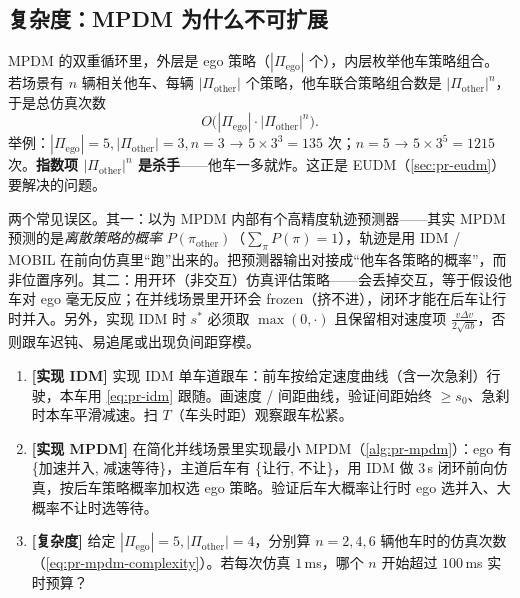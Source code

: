 \subsection{复杂度：MPDM 为什么不可扩展}
\label{sec:pr-mpdm-complexity}

MPDM 的双重循环里，外层是 ego 策略（$|\Pi_{\mathrm{ego}}|$ 个），内层枚举他车策略组合。若场景有 $n$ 辆相关他车、每辆 $|\Pi_{\mathrm{other}}|$ 个策略，他车联合策略组合数是 $|\Pi_{\mathrm{other}}|^{n}$，于是总仿真次数
\begin{equation}
  O\big(|\Pi_{\mathrm{ego}}|\cdot|\Pi_{\mathrm{other}}|^{n}\big).
  \label{eq:pr-mpdm-complexity}
\end{equation}
举例：$|\Pi_{\mathrm{ego}}|=5,|\Pi_{\mathrm{other}}|=3,n=3$ → $5\times3^3=135$ 次；$n=5$ → $5\times3^5=1215$ 次。\textbf{指数项 $|\Pi_{\mathrm{other}}|^{n}$ 是杀手}——他车一多就炸。这正是 EUDM（\cref{sec:pr-eudm}）要解决的问题。

\begin{pitfall}
两个常见误区。其一：以为 MPDM 内部有个高精度轨迹预测器——其实 MPDM 预测的是\emph{离散策略的概率} $P(\pi_{\mathrm{other}})$（$\sum_\pi P(\pi)=1$），轨迹是用 IDM / MOBIL 在前向仿真里“跑”出来的。把预测器输出对接成“他车各策略的概率”，而非位置序列。其二：用开环（非交互）仿真评估策略——会丢掉交互，等于假设他车对 ego 毫无反应；在并线场景里开环会 frozen（挤不进），闭环才能在后车让行时并入。另外，实现 IDM 时 $s^*$ 必须取 $\max(0,\cdot)$ 且保留相对速度项 $\frac{v\Delta v}{2\sqrt{ab}}$，否则跟车迟钝、易追尾或出现负间距穿模。
\end{pitfall}

\begin{practice}
\begin{enumerate}
  \item \textbf{[实现 IDM]} 实现 IDM 单车道跟车：前车按给定速度曲线（含一次急刹）行驶，本车用 \cref{eq:pr-idm} 跟随。画速度 / 间距曲线，验证间距始终 $\ge s_0$、急刹时本车平滑减速。扫 $T$（车头时距）观察跟车松紧。
  \item \textbf{[实现 MPDM]} 在简化并线场景里实现最小 MPDM（\cref{alg:pr-mpdm}）：ego 有 \{加速并入, 减速等待\}，主道后车有 \{让行, 不让\}，用 IDM 做 $3\,$s 闭环前向仿真，按后车策略概率加权选 ego 策略。验证后车大概率让行时 ego 选并入、大概率不让时选等待。
  \item \textbf{[复杂度]} 给定 $|\Pi_{\mathrm{ego}}|=5,|\Pi_{\mathrm{other}}|=4$，分别算 $n=2,4,6$ 辆他车时的仿真次数（\cref{eq:pr-mpdm-complexity}）。若每次仿真 $1\,$ms，哪个 $n$ 开始超过 $100\,$ms 实时预算？
\end{enumerate}
\end{practice}

